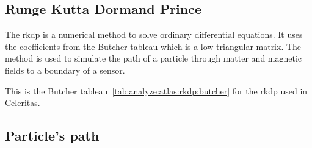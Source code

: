 \subsection{Runge Kutta Dormand Prince}
\label{ch:analyze:atlas:rkdp}

The \acrfull{rkdp} is a numerical method to solve ordinary differential equations.
It uses the coefficients from the Butcher tableau which is a low triangular
matrix.
The method is used to simulate the path of a particle through matter and
magnetic fields to a boundary of a sensor.

This is the Butcher tableau~\ref{tab:analyze:atlas:rkdp:butcher} for the \acrshort{rkdp} used in Celeritas.

\begin{table}[ht]
    \label{tab:analyze:atlas:rkdp:butcher}
\end{table}



\subsection{Particle's path}
\label{ch:analyze:atlas:path}

